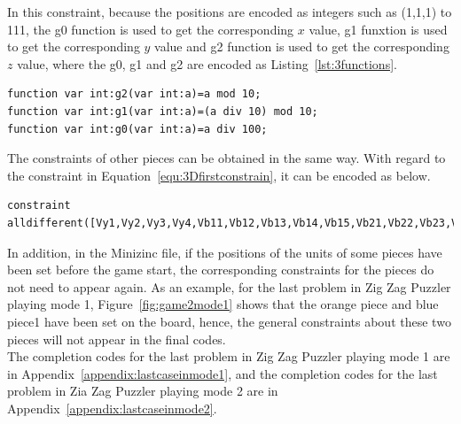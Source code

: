\bigskip
\smallbreak
In this constraint, because the positions are encoded as integers such as (1,1,1) to 111, the g0 function is used to get the corresponding $x$ value, g1 funxtion is used to get the corresponding $y$ value and g2 function is used to get the corresponding $z$ value, where the g0, g1 and g2 are encoded as Listing~\ref{lst:3functions}.
\begin{lstlisting}[language=minizinc,numbers=none,caption={Encoding for 3Dblue piece1},label={lst:3functions}]
function var int:g2(var int:a)=a mod 10;
function var int:g1(var int:a)=(a div 10) mod 10;
function var int:g0(var int:a)=a div 100;
\end{lstlisting}
\bigskip
\smallbreak
The constraints of other pieces can be obtained in the same way. With regard to the constraint in Equation~\ref{equ:3Dfirstconstrain}, it can be encoded as below.
\begin{lstlisting}[language=minizinc,numbers=none,caption={Encoding for constraint two},label={lst:3Dalldifferent}]
constraint alldifferent([Vy1,Vy2,Vy3,Vy4,Vb11,Vb12,Vb13,Vb14,Vb15,Vb21,Vb22,Vb23,Vb24,Vb25,Vg11,Vg12,Vg13,Vg14,Vg21,Vg22,Vg23,Vr11,Vr12,Vr13,Vr21,Vr22,Vr23,Vo1,Vo2,Vo3,Vo4,Vp1,Vp2,Vp3,Vp4]);
\end{lstlisting}
\bigskip
\smallbreak
In addition, in the Minizinc file, if the positions of the units of some pieces have been set before the game start, the corresponding constraints for the pieces do not need to appear again. As an example, for the last problem in Zig Zag Puzzler playing mode 1, Figure~\ref{fig:game2mode1} shows that the orange piece and blue piece1 have been set on the board, hence, the general constraints about these two pieces will not appear in the final codes.
\\The completion codes for the last problem in Zig Zag Puzzler playing mode 1 are in Appendix~\ref{appendix:lastcaseinmode1}, and the completion codes for the last problem in Zia Zag Puzzler playing mode 2 are in Appendix~\ref{appendix:lastcaseinmode2}. 